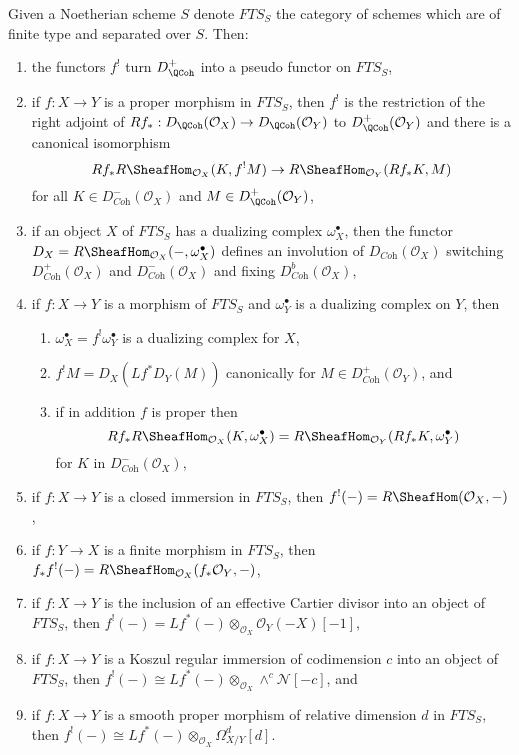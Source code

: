 \medskip\noindent
Given a Noetherian scheme $S$ denote $\textit{FTS}_S$ the category
of schemes which are of finite type and separated over $S$. Then:
\begin{enumerate}
\item the functors $f^!$ turn $D_\QCoh^+$ into a pseudo functor
on $\textit{FTS}_S$,
\item if $f : X \to Y$ is a proper morphism in $\textit{FTS}_S$,
then $f^!$ is the restriction of the right adjoint of
$Rf_* : D_\QCoh(\mathcal{O}_X) \to D_\QCoh(\mathcal{O}_Y)$
to $D_\QCoh^+(\mathcal{O}_Y)$ and there is a canonical isomorphism
$$
Rf_*R\SheafHom_{\mathcal{O}_X}(K, f^!M)
\to
R\SheafHom_{\mathcal{O}_Y}(Rf_*K, M)
$$
for all $K \in D_{\textit{Coh}}^-(\mathcal{O}_X)$ and
$M \in D_\QCoh^+(\mathcal{O}_Y)$,
\item if an object $X$ of $\textit{FTS}_S$ has a dualizing complex
$\omega_X^\bullet$, then the functor
$D_X = R\SheafHom_{\mathcal{O}_X}(-, \omega_X^\bullet)$
defines an involution of $D_{\textit{Coh}}(\mathcal{O}_X)$
switching $D_{\textit{Coh}}^+(\mathcal{O}_X)$ and
$D_{\textit{Coh}}^-(\mathcal{O}_X)$ and fixing
$D_{\textit{Coh}}^b(\mathcal{O}_X)$,
\item if $f : X \to Y$ is a morphism of $\textit{FTS}_S$
and $\omega_Y^\bullet$ is a dualizing complex on $Y$, then
\begin{enumerate}
\item $\omega_X^\bullet = f^!\omega_Y^\bullet$ is a dualizing complex for $X$,
\item $f^!M = D_X(Lf^*D_Y(M))$ canonically for
$M \in D_{\textit{Coh}}^+(\mathcal{O}_Y)$, and
\item if in addition $f$ is proper then
$$
Rf_*R\SheafHom_{\mathcal{O}_X}(K, \omega_X^\bullet) =
R\SheafHom_{\mathcal{O}_Y}(Rf_*K, \omega_Y^\bullet)
$$
for $K$ in $D^-_{\textit{Coh}}(\mathcal{O}_X)$,
\end{enumerate}
\item if $f : X \to Y$ is a closed immersion in $\textit{FTS}_S$,
then $f^!(-) = R\SheafHom(\mathcal{O}_X, -)$,
\item if $f : Y \to X$ is a finite morphism in $\textit{FTS}_S$,
then $f_*f^!(-) = R\SheafHom_{\mathcal{O}_X}(f_*\mathcal{O}_Y, -)$,
\item if $f : X \to Y$ is the inclusion of an effective Cartier divisor
into an object of $\textit{FTS}_S$, then
$f^!(-) = Lf^*(-) \otimes_{\mathcal{O}_X} \mathcal{O}_Y(-X)[-1]$,
\item if $f : X \to Y$ is a Koszul regular immersion of codimension $c$
into an object of $\textit{FTS}_S$, then
$f^!(-) \cong Lf^*(-) \otimes_{\mathcal{O}_X} \wedge^c\mathcal{N}[-c]$, and
\item if $f : X \to Y$ is a smooth proper morphism of relative dimension $d$
in $\textit{FTS}_S$, then
$f^!(-) \cong Lf^*(-)  \otimes_{\mathcal{O}_X} \Omega^d_{X/Y}[d]$.
\end{enumerate}
